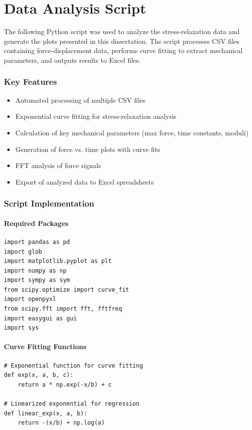 \chapter{Data Analysis Script}\label{appendix:data_analysis_script}

The following Python script was used to analyze the stress-relaxation data and generate the plots presented in this dissertation. The script processes CSV files containing force-displacement data, performs curve fitting to extract mechanical parameters, and outputs results to Excel files.

\subsection{Key Features}
\begin{itemize}
    \item Automated processing of multiple CSV files
    \item Exponential curve fitting for stress-relaxation analysis 
    \item Calculation of key mechanical parameters (max force, time constants, moduli)
    \item Generation of force vs. time plots with curve fits
    \item FFT analysis of force signals
    \item Export of analyzed data to Excel spreadsheets
\end{itemize}

\subsection{Script Implementation}

\subsubsection{Required Packages}
\begin{lstlisting}[caption={Required package imports}]
import pandas as pd
import glob
import matplotlib.pyplot as plt
import numpy as np
import sympy as sym
from scipy.optimize import curve_fit
import openpyxl
from scipy.fft import fft, fftfreq
import easygui as gui
import sys
\end{lstlisting}

\subsubsection{Curve Fitting Functions}
\begin{lstlisting}[caption={Curve fitting function definitions}]
# Exponential function for curve fitting
def exp(x, a, b, c):
    return a * np.exp(-x/b) + c

# Linearized exponential for regression
def linear_exp(x, a, b):
    return -(x/b) + np.log(a)
\end{lstlisting}

